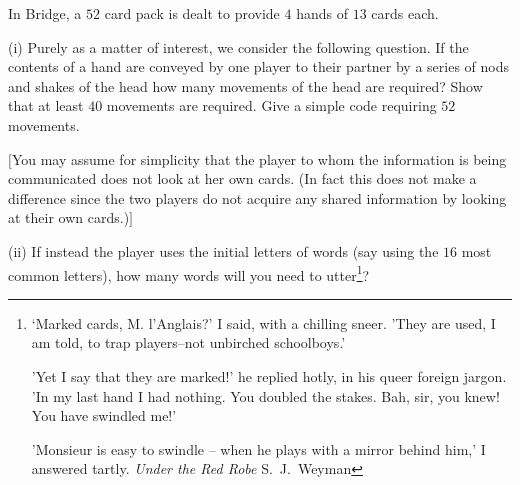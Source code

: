 \begin{question}\label{C1.8} 
In Bridge, a $52$ card pack is dealt
to provide $4$ hands of $13$ cards each. 

(i) Purely as
a matter of interest, we consider the following question.
If the contents of a hand are conveyed by one player 
to their partner by a series of nods and shakes of the head
how many movements of the head are required?
Show that at least $40$ movements are required.
Give a simple code requiring $52$ movements.

$[$You may assume for simplicity that the player to
whom the information is being communicated does not
look at her own cards. (In fact this does not make
a difference since the two players do not acquire
any shared information by looking at their
own cards.)$]$



(ii) If instead the player uses the initial letters
of words (say using the $16$ most common letters),
how many words will you 
need to utter\footnote{`Marked cards, M. l'Anglais?' I said, 
with a chilling sneer. 'They are used, I am told, 
to trap players--not unbirched schoolboys.'

'Yet I say that they are marked!' 
he replied hotly, in his queer foreign jargon. 
'In my last hand I had nothing. You doubled the stakes. 
Bah, sir, you knew! You have swindled me!'

'Monsieur is easy to swindle
-- when he plays with a mirror behind him,' 
I answered tartly. \emph{Under the Red Robe} S.~J.~Weyman}?
\end{question}


